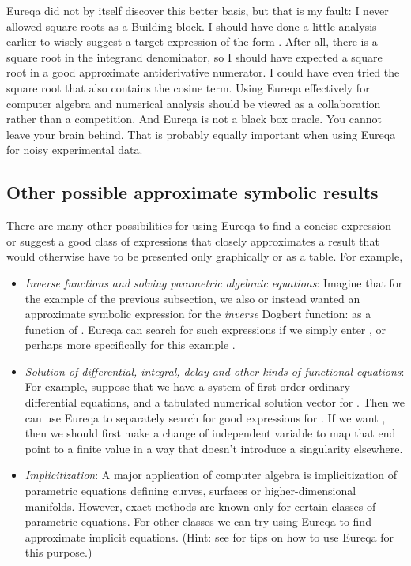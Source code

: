 \documentclass[12pt,english]{article}
\begin{document}
Eureqa did not by itself discover this better basis, but that is my
fault: I never allowed square roots as a Building block. I should
have done a little analysis earlier to wisely suggest a target expression
of the form . After
all, there is a square root in the integrand denominator, so I should
have expected a square root in a good approximate antiderivative numerator.
I could have even tried the square root that also contains the cosine
term. Using Eureqa effectively for computer algebra and numerical
analysis should be viewed as a collaboration rather than a competition.
And Eureqa is not a black box oracle. You cannot leave your brain
behind. That is probably equally important when using Eureqa for noisy
experimental data.


\subsection{Other possible approximate symbolic results}

There are many other possibilities for using Eureqa to find a concise
expression or suggest a good class of expressions that closely approximates
a result that would otherwise have to be presented only graphically
or as a table. For example,\vspace{-5pt}

\begin{itemize}
\item \textsl{Inverse functions and solving parametric algebraic equations}:
Imagine that for the example of the previous subsection, we also or
instead wanted an approximate symbolic expression for the \textsl{inverse}
Dogbert  function:  as a function of . Eureqa can search
for such expressions if we simply enter , or perhaps more
specifically for this example .\vspace{-5pt}

\item \textsl{Solution of differential, integral, delay and other kinds
of functional equations}: For example, suppose that we have a system
of first-order ordinary differential equations, and a tabulated numerical
solution vector  for .
Then we can use Eureqa to separately search for good expressions for
. If we want , then we should
first make a change of independent variable to map that end point
to a finite value in a way that doesn't introduce a singularity elsewhere.\vspace{-5pt}

\item \textsl{Implicitization}: A major application of computer algebra
is implicitization of parametric equations defining curves, surfaces
or higher-dimensional manifolds. However, exact methods are known
only for certain classes of parametric equations. For other classes
we can try using Eureqa to find approximate implicit equations. (Hint:
see \cite{SchmidtAndLipsonImplicitEqn} for tips on how to use Eureqa
for this purpose.)
\end{itemize}
\end{document}
